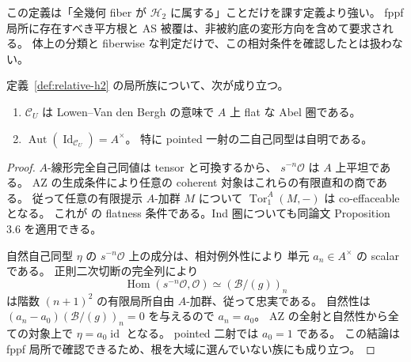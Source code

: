 この定義は「全幾何 fiber が $\mathcal H_2$ に属する」ことだけを課す定義より強い。
fppf 局所に存在すべき平方根と AS 被覆は、非被約底の変形方向を含めて要求される。
体上の分類と fiberwise な判定だけで、この相対条件を確認したとは扱わない。

\begin{lemma}
\label{lem:relative-h2-flat-center}
定義~\ref{def:relative-h2} の局所族について、次が成り立つ。
\begin{enumerate}
\item $\mathcal C_U$ は Lowen--Van den Bergh の意味で $A$ 上 flat な Abel 圏である。
\item $\operatorname{Aut}(\operatorname{Id}_{\mathcal C_U})=A^\times$。
  特に pointed 一射の二自己同型は自明である。
\end{enumerate}
\end{lemma}
\begin{proof}
$A$-線形完全自己同値は tensor と可換するから、
$s^{-n}\mathcal O$ は $A$ 上平坦である。
AZ の生成条件により任意の coherent 対象はこれらの有限直和の商である。
従って任意の有限提示 $A$-加群 $M$ について
$\operatorname{Tor}^A_1(M,-)$ は co-effaceable となる。
これが \cite[Proposition 3.1, Definition 3.2]{LowenVanDenBergh2006}
の flatness 条件である。Ind 圏についても同論文 Proposition 3.6 を適用できる。

自然自己同型 $\eta$ の $s^{-n}\mathcal O$ 上の成分は、相対例外性により
単元 $a_n\in A^\times$ の scalar である。
正則二次切断の完全列により
\[
 \operatorname{Hom}(s^{-n}\mathcal O,\mathcal O)
       \simeq (\mathcal B/(g))_n
\]
は階数 $(n+1)^2$ の有限局所自由 $A$-加群、従って忠実である。
自然性は $(a_n-a_0)(\mathcal B/(g))_n=0$ を与えるので $a_n=a_0$。
AZ の全射と自然性から全ての対象上で $\eta=a_0\operatorname{id}$ となる。
pointed 二射では $a_0=1$ である。
この結論は fppf 局所で確認できるため、根を大域に選んでいない族にも成り立つ。
\end{proof}

